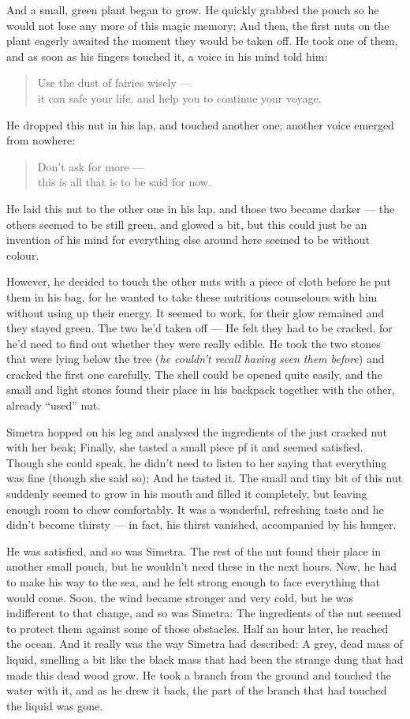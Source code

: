 And a small, green plant began to grow. He quickly grabbed the pouch so he would not lose any more of this magic memory; And then, the first nuts on the plant eagerly awaited the moment they would be taken off. 
He took one of them, and as soon as his fingers touched it, a voice in his mind told him:
\begin{verse}
Use the dust of fairies wisely ---\\
it can safe your life, and help you to continue your voyage.
\end{verse}
He dropped this nut in his lap, and touched another one; another voice emerged from nowhere:
\begin{verse}
Don't ask for more ---\\
this is all that is to be said for now.
\end{verse}
He laid this nut to the other one in his lap, and those two became darker --- the others seemed to be still green, and glowed a bit,
but this could just be an invention of his mind for everything else around here seemed to be without colour.

However, he decided to touch the other nuts with a piece of cloth before he put them in his bag, for he wanted to take these nutritious counselours with him without using up their energy.
It seemed to work, for their glow remained and they stayed green. The two he'd taken off --- He felt they had to be cracked, for he'd need to find out whether they were really edible.
He took the two stones that were lying below the tree (\emph{he couldn't recall having seen them before}) and cracked the first one carefully.
The shell could be opened quite easily, and the small and light stones found their place in his backpack together with the other, already \enquote{used} nut.

Simetra hopped on his leg and analysed the ingredients of the just cracked nut with her beak; Finally, she tasted a small piece pf it and seemed satisfied. Though she could speak, he didn't need to listen to her saying that everything was fine (though she said so); And he tasted it. 
The small and tiny bit of this nut suddenly seemed to grow in his mouth and filled it completely, but leaving enough room to chew comfortably. It was a wonderful, refreshing taste and he didn't become thirsty ---
in fact, his thirst vanished, accompanied by his hunger. 

He was satisfied, and so was Simetra. The rest of the nut found their place in another small pouch, but he wouldn't need these in the next hours. 
Now, he had to make his way to the sea, and he felt strong enough to face everything that would come. 
Soon, the wind became stronger and very cold, but he was indifferent to that change, and so was Simetra: The ingredients of the nut seemed to protect them against some of those obstacles. Half an hour later, he reached the ocean. 
And it really was the way Simetra had described: A grey, dead mass of liquid, smelling a bit like the black mass that had been the strange dung that had made this dead wood grow. He took a branch from the ground and touched the water with it, and as he drew it back, the part of the branch that had touched the liquid was gone.

